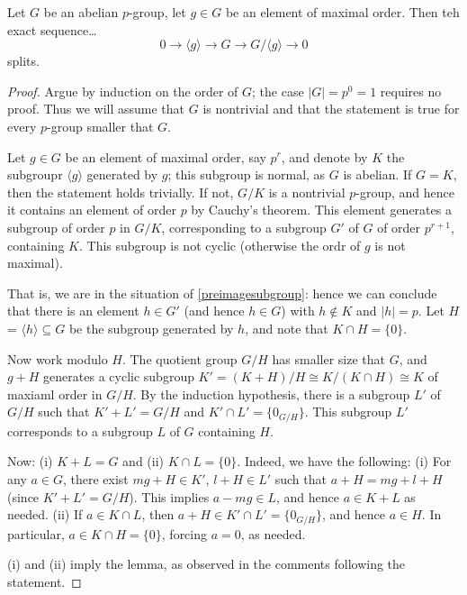 \begin{lemma}
\label{sequenceabeliangroups}
Let $G$ be an abelian $p$-group, let $g \in G$ be an element of maximal order. Then teh exact sequence\dots
$$0 \rightarrow \langle g \rangle \rightarrow G \rightarrow G / \langle g \rangle \rightarrow 0$$
splits.
\end{lemma}

\begin{proof}
Argue by induction on the order of $G$; the case $|G| = p^0 = 1$ requires no proof. Thus we will assume that $G$ is nontrivial and that the statement is true for every $p$-group smaller that $G$.

Let $g \in G$ be an element of maximal order, say $p^r$, and denote by $K$ the subgroupr $\langle g \rangle$ generated by $g$; this subgroup is normal, as $G$ is abelian. If $G = K$, then the statement
holds trivially. If not, $G/K$ is a nontrivial $p$-group, and hence it contains an element of order $p$ by Cauchy's theorem. This element generates a subgroup of order $p$ in $G/K$, corresponding to a subgroup $G'$
of $G$ of order $p^{r+1}$, containing $K$. This subgroup is not cyclic (otherwise the ordr of $g$ is not maximal).

That is, we are in the situation of \ref{preimagesubgroup}: hence we can conclude that there is an element $h \in G'$ (and hence $h \in G$) with $h \not \in K$ and $|h| = p$. Let $H$ = $\langle h \rangle \subseteq G$
be the subgroup generated by $h$, and note that $K \cap H = \{ 0 \}$.

Now work modulo $H$. The quotient group $G/H$ has smaller size that $G$, and $g + H$ generates a cyclic subgroup $K' = (K + H)/H \cong K/(K \cap H) \cong K$ of maxiaml order in $G/H$. By the induction hypothesis, there
is a subgroup $L'$ of $G/H$ such that $K' + L' = G/H$ and $K' \cap L' = \{ 0_{G/H} \}$. This subgroup $L'$ corresponds to a subgroup $L$ of $G$ containing $H$.

Now: (i) $K + L = G$ and (ii) $K \cap L = \{ 0 \}$. Indeed, we have the following:
(i) For any $a \in G$, there exist $mg + H \in K'$, $l + H \in L'$ such that $a + H = mg + l + H$ (since $K' + L' = G/H$). This implies $a - mg \in L$, and hence $a \in K + L$ as needed.
(ii) If $a \in K \cap L$, then $a + H \in K' \cap L' = \{ 0_{G/H} \}$, and hence $a \in H$. In particular, $a \in K \cap H = \{ 0 \}$, forcing $a = 0$, as needed.

(i) and (ii) imply the lemma, as observed in the comments following the statement.
\end{proof}


